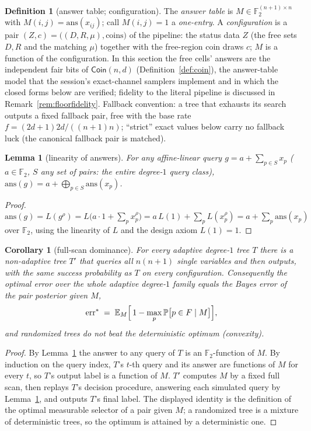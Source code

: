 \documentclass[11pt]{article}
\newtheorem{lemma}[theorem]{Lemma}
\newtheorem{corollary}[theorem]{Corollary}
\theoremstyle{definition}
\newtheorem{definition}[theorem]{Definition}
\theoremstyle{remark}
\newcommand{\F}{\mathbb{F}}
\newcommand{\Prob}{\mathbb{P}}
\begin{document}
\begin{definition}[answer table; configuration]\label{def:table}
The \emph{answer table} is $M\in\F_2^{(n+1)\times n}$ with
$M(i,j)=\mathrm{ans}(x_{ij})$; call $M(i,j)=1$ a \emph{one-entry}.  A
\emph{configuration} is a pair $(Z,c)=\bigl((D,R,\mu),\text{coins}\bigr)$
of the pipeline: the status data $Z$ (the free sets $D,R$ and the
matching $\mu$) together with the free-region coin draws $c$; $M$ is a
function of the configuration.  In this section the free cells'
answers are the independent fair bits of $\mathsf{Coin}(n,d)$
(Definition~\ref{def:coin}), the answer-table model that the session's
exact-channel samplers implement and in which the closed forms below
are verified; fidelity to the literal pipeline is discussed in
Remark~\ref{rem:floorfidelity}.  Fallback convention: a tree that
exhausts its search outputs a fixed fallback pair, free with the base
rate $f=(2d+1)2d/((n+1)n)$; ``strict'' exact values below carry no
fallback luck (the canonical fallback pair is matched).
\end{definition}

\begin{lemma}[linearity of answers]\label{lem:linear}
For any affine-linear query $g=a+\sum_{p\in S}x_p$ ($a\in\F_2$, $S$ any
set of pairs: the entire degree-$1$ query class),
$\mathrm{ans}(g)=a+\bigoplus_{p\in S}\mathrm{ans}(x_p)$.
\end{lemma}

\begin{proof}
$\mathrm{ans}(g)=L(g^{\rho})
=L\bigl(a\cdot 1+\sum_px_p^{\rho}\bigr)
=a\,L(1)+\sum_pL(x_p^{\rho})
=a+\sum_p\mathrm{ans}(x_p)$ over $\F_2$, using the linearity of $L$
and the design axiom $L(1)=1$.
\end{proof}

\begin{corollary}[full-scan dominance]\label{cor:fullscan}
For every adaptive degree-$1$ tree $T$ there is a \emph{non-adaptive}
tree $T'$ that queries all $n(n+1)$ single variables and then outputs,
with the same success probability as $T$ on every configuration.
Consequently the optimal error over the whole adaptive degree-$1$
family equals the Bayes error of the pair posterior given $M$,
\[
\mathrm{err}^*\;=\;\mathbb{E}_M\Bigl[\,1-\max_p\Prob\bigl[p\in F\mid
M\bigr]\Bigr],
\]
and randomized trees do not beat the deterministic optimum (convexity).
\end{corollary}

\begin{proof}
By Lemma~\ref{lem:linear} the answer to any query of $T$ is an
$\F_2$-function of $M$.  By induction on the query index, $T$'s
$t$-th query and its answer are functions of $M$ for every $t$, so
$T$'s output label is a function of $M$.  $T'$ computes $M$ by a fixed
full scan, then replays $T$'s decision procedure, answering each
simulated query by Lemma~\ref{lem:linear}, and outputs $T$'s final
label.  The displayed identity is the definition of the optimal
measurable selector of a pair given $M$; a randomized tree is a
mixture of deterministic trees, so the optimum is attained by a
deterministic one.
\end{proof}
\end{document}
